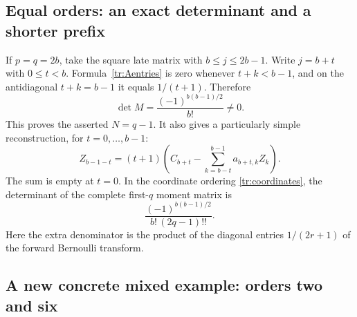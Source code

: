 \documentclass[11pt,a4paper]{article}
\numberwithin{equation}{section}
\theoremstyle{definition}
\begin{document}
\subsection{Equal orders: an exact determinant and a shorter prefix}

If $p=q=2b$, take the square late matrix with $b\le j\le2b-1$.
Write $j=b+t$ with $0\le t<b$. Formula~\eqref{tr:Aentries} is zero
whenever $t+k<b-1$, and on the antidiagonal $t+k=b-1$ it equals
$1/(t+1)$. Therefore
\begin{equation}\label{tr:diagonal-det}
 \det M=\frac{(-1)^{b(b-1)/2}}{b!}\ne0.
\end{equation}
This proves the asserted $N=q-1$. It also gives a particularly simple
reconstruction, for $t=0,\ldots,b-1$:
\begin{equation}\label{tr:diagonal-recursion}
 Z_{b-1-t}=(t+1)\left(
 C_{b+t}-\sum_{k=b-t}^{b-1}a_{b+t,k}Z_k\right).
\end{equation}
The sum is empty at $t=0$. In the coordinate ordering
\eqref{tr:coordinates}, the determinant of the complete first-$q$
moment matrix is
\begin{equation}\label{tr:complete-det}
 \frac{(-1)^{b(b-1)/2}}{b!\,(2q-1)!!}.
\end{equation}
Here the extra denominator is the product of the diagonal entries
$1/(2r+1)$ of the forward Bernoulli transform.

\subsection{A new concrete mixed example: orders two and six}
\end{document}

